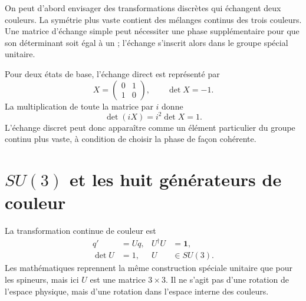 On peut d’abord envisager des transformations discrètes qui échangent deux couleurs. La symétrie plus vaste contient des mélanges continus des trois couleurs. Une matrice d’échange simple peut nécessiter une phase supplémentaire pour que son déterminant soit égal à un ; l’échange s’inscrit alors dans le groupe spécial unitaire.

Pour deux états de base, l’échange direct est représenté par
\begin{equation}
X=
\begin{pmatrix}0&1\\1&0\end{pmatrix},
\qquad
\det X=-1.
\end{equation}
La multiplication de toute la matrice par \(i\) donne
\begin{equation}
\det(iX)=i^2\det X=1.
\end{equation}
L’échange discret peut donc apparaître comme un élément particulier du groupe continu plus vaste, à condition de choisir la phase de façon cohérente.

\begin{classroomqa}\end{classroomqa}

\section{\texorpdfstring{\(SU(3)\)}{SU(3)} et les huit générateurs de couleur}

La transformation continue de couleur est
\begin{equation}
\begin{aligned}
q'&=Uq,
&
U^\dagger U&=\boldsymbol 1,
\\
\det U&=1,
&
U&\in SU(3).
\end{aligned}
\label{eq:l3-su3-action}
\end{equation}
Les mathématiques reprennent la même construction spéciale unitaire que pour les spineurs, mais ici \(U\) est une matrice \(3\times3\). Il ne s’agit pas d’une rotation de l’espace physique, mais d’une rotation dans l’espace interne des couleurs.

